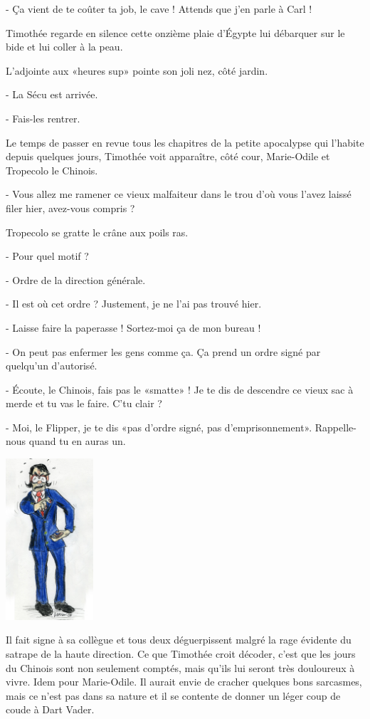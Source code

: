 - Ça vient de te coûter ta job, le cave ! Attends que j’en parle à Carl !

Timothée regarde en silence cette onzième plaie d’Égypte lui débarquer sur le bide et lui coller à la peau.

L’adjointe aux «heures sup» pointe son joli nez, côté jardin.

- La Sécu est arrivée.

- Fais-les rentrer.

Le temps de passer en revue tous les chapitres de la petite apocalypse qui l’habite depuis quelques jours, Timothée voit apparaître, côté cour, Marie-Odile et Tropecolo le Chinois.

- Vous allez me ramener ce vieux malfaiteur dans le trou d’où vous l’avez laissé filer hier, avez-vous compris ?

Tropecolo se gratte le crâne aux poils ras.

- Pour quel motif ?

- Ordre de la direction générale.

- Il est où cet ordre ? Justement, je ne l’ai pas trouvé hier.

- Laisse faire la paperasse ! Sortez-moi ça de mon bureau !

- On peut pas enfermer les gens comme ça. Ça prend un ordre signé par quelqu’un d’autorisé.

- Écoute, le Chinois, fais pas le «smatte» ! Je te dis de descendre ce vieux sac à merde et tu vas le faire. C’tu clair ?

- Moi, le Flipper, je te dis «pas d’ordre signé, pas d’emprisonnement». Rappelle-nous quand tu en auras un.

\begin{floatingfigure}[l]{40mm}
\includegraphics[height=60mm]{corps/chapitre12/img/personnage-dauphin.jpg}
\end{floatingfigure}

Il fait signe à sa collègue et tous deux déguerpissent malgré la rage évidente du satrape de la haute direction. Ce que Timothée croit décoder, c’est que les jours du Chinois sont non seulement comptés, mais qu’ils lui seront très douloureux à vivre. Idem pour Marie-Odile. Il aurait envie de cracher quelques bons sarcasmes, mais ce n’est pas dans sa nature et il se contente de donner un léger coup de coude à Dart Vader.

